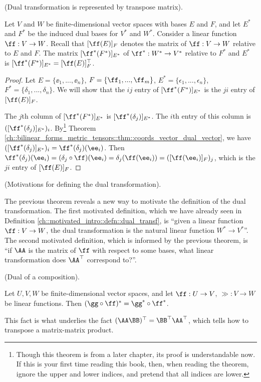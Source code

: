 \begin{theorem}
    (Dual transformation is represented by transpose matrix).

    Let $V$ and $W$ be finite-dimensional vector spaces with bases $E$ and $F$, and let $E^*$ and $F^*$ be the induced dual bases for $V^*$ and $W^*$. Consider a linear function $\ff:V \rightarrow W$. Recall that $[\ff(E)]_F$ denotes the matrix of $\ff:V \rightarrow W$ relative to $E$ and $F$. The matrix $[\ff^*(F^*)]_{E^*}$ of $\ff^*:W^* \rightarrow V^*$ relative to $F^*$ and $E^*$ is $[\ff^*(F^*)]_{E^*} = [\ff(E)]_F^{\top}$.
\end{theorem}

\begin{proof}
    Let $E = \{\ee_1, ..., \ee_n\}$, $F = \{\ff_1, ..., \ff_m\}$, $E^* = \{\epsilon_1, ..., \epsilon_n\}$, $F^* = \{\delta_1, ..., \delta_n\}$. We will show that the $ij$ entry of $[\ff^*(F^*)]_{E^*}$ is the $ji$ entry of $[\ff(E)]_F$.
    
    The $j$th column of $[\ff^*(F^*)]_{E^*}$ is $[\ff^*(\delta_j)]_{E^*}$. The $i$th entry of this column is $([\ff^*(\delta_j)]_{E^*})_i$. By\footnote{Though this theorem is from a later chapter, its proof is understandable now. If this is your first time reading this book, then, when reading the theorem, ignore the upper and lower indices, and pretend that all indices are lower.} Theorem \ref{ch::bilinear_forms_metric_tensors::thm::coords_vector_dual_vector}, we have $([\ff^*(\delta_j)]_{E^*})_i = \ff^*(\delta_j)(\ee_i)$. Then $\ff^*(\delta_j)(\ee_i) = (\delta_j \circ \ff)(\ee_i) = \delta_j(\ff(\ee_i)) = ([\ff(\ee_i)]_F)_j$, which is the $ji$ entry of $[\ff(E)]_F$.
\end{proof}

\begin{remark}
    (Motivations for defining the dual transformation).
    
    The previous theorem reveals a new way to motivate the definition of the dual transformation. The first motivated definition, which we have already seen in Definition \ref{ch::motivated_intro::defn::dual_transf}, is ``given a linear function $\ff:V \rightarrow W$, the dual transformation is the natural linear function $W^* \rightarrow V^*$''. The second motivated definition, which is informed by the previous theorem, is ``if $\AA$ is the matrix of $\ff$ with respect to some bases, what linear transformation does $\AA^\top$ correspond to?''.
\end{remark}

\begin{theorem}
     (Dual of a composition).
     
     Let $U, V, W$ be finite-dimensional vector spaces, and let $\ff:U \rightarrow V$, $\gg:V \rightarrow W$ be linear functions. Then $(\gg \circ \ff)^* = \gg^* \circ \ff^*$. 
     
     This fact is what underlies the fact $(\AA \BB)^\top = \BB^\top \AA^\top$, which tells how to transpose a matrix-matrix product.
\end{theorem}

